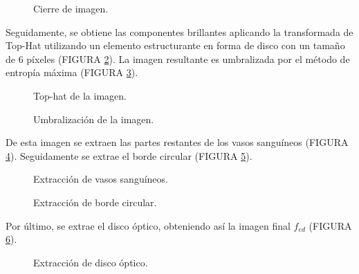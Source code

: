 \begin{figure}[H]
\centering
{}

\caption{Cierre de imagen.} \label{fig:exu_2}
\end{figure}

Seguidamente, se obtiene las componentes brillantes aplicando la transformada de Top-Hat utilizando un elemento estructurante en forma de disco con un tamaño de 6 píxeles (FIGURA \ref{fig:exu_3}).
La imagen resultante es umbralizada por el método de entropía máxima (FIGURA \ref{fig:exu_4}).
\begin{figure}[H]
\centering
{}

\caption{Top-hat de la imagen.} \label{fig:exu_3}
\end{figure}


\begin{figure}[H]
\centering
{}

\caption{Umbralización de la imagen.} \label{fig:exu_4}
\end{figure}

De esta imagen se extraen las partes restantes de los vasos sanguíneos (FIGURA \ref{fig:exu_5}). Seguidamente se extrae el borde circular (FIGURA \ref{fig:exu_6}).

\begin{figure}[H]
\centering
{}
\caption{Extracción de vasos sanguíneos.} \label{fig:exu_5}
\end{figure}


\begin{figure}[H]
\centering
{}
\caption{Extracción de borde circular.} \label{fig:exu_6}
\end{figure}
Por último, se extrae el disco óptico, obteniendo así la imagen final $f_{ed}$ (FIGURA \ref{fig:exu_7}).
\begin{figure}[H]
\centering
{}
\caption{Extracción de disco óptico.} \label{fig:exu_7}
\end{figure}
 
